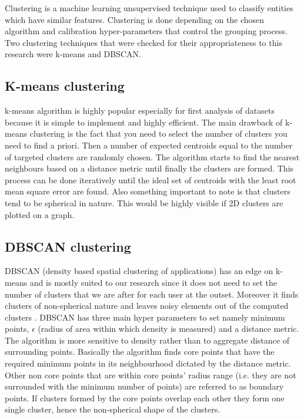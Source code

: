 \documentclass[12pt, a4paper]{report}
\theoremstyle{definition}
\theoremstyle{definition}%
\theoremstyle{definition}%
\theoremstyle{definition}%
\theoremstyle{definition}%
\theoremstyle{definition}%
\begin{document}
Clustering is a machine learning unsupervised technique used to classify entities which have similar features. Clustering is done depending on the chosen algorithm and calibration hyper-parameters that control the grouping process. Two clustering techniques that were checked for their appropriateness to this research were k-means and DBSCAN. 

\subsection{K-means clustering}
k-means algorithm is highly popular especially for first analysis of datasets because it is simple to implement and highly efficient. The main drawback of k-means clustering is the fact that you need to select the number of clusters you need to find a priori. Then a number of expected centroids equal to the number of targeted clusters are randomly chosen. The algorithm starts to find the nearest neighbours based on a distance metric until finally the clusters are formed. This process can be done iteratively until the ideal set of centroids with the least root mean square error are found. Also something important to note is that clusters tend to be spherical in nature. This would be highly visible if 2D clusters are plotted on a graph.

\subsection{DBSCAN clustering}
DBSCAN (density based spatial clustering of applications) has an edge on k-means and is mostly suited to our research since it does not need to set the number of clusters that we are after for each user at the outset. Moreover it finds clusters of non-spherical nature and leaves noisy elements out of the computed clusters \cite{ChakrabortyNKNagwaniLopamudraDey2011}. DBSCAN has three main hyper parameters to set namely minimum points,  $\epsilon$ (radius of area within which density is measured)  and a distance metric. The algorithm is more sensitive to density rather than to aggregate distance of surrounding points. Basically the algorithm finds core points that have the required minimum points in its neighbourhood dictated by the distance metric. Other non core points that are within core points' radius range (i.e. they are not surrounded with the minimum number of points) are referred to as boundary points. If clusters formed by the core points overlap each other they form one single cluster, hence the non-spherical shape of the clusters. 
\end{document}
